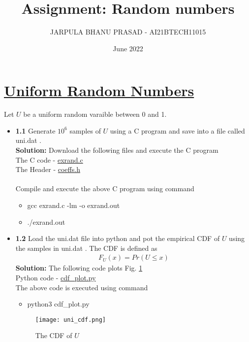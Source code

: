 \documentclass[journal,12pt,twocolumn]{IEEEtran}
\title{Assignment: Random numbers}
\author{JARPULA BHANU PRASAD - AI21BTECH11015}
\date{June 2022}
\begin{document}
\maketitle
\newcommand{\solution}{\noindent \textbf{Solution: }}

\section{\underline{Uniform Random Numbers}}
Let $U$ be a uniform random varaible between 0 and 1.
\begin{itemize}
    \item \textbf{1.1} Generate $10^6$ samples of $U$ using a C program and save into a file called uni.dat .\\
    \solution Download the following files and execute the C program \\
    The C code - \href{https://github.com/jarpula-Bhanu/Random-numbers/blob/main/codes/exrand.c}{exrand.c} \\
    The Header - \href{https://github.com/jarpula-Bhanu/Random-numbers/blob/main/codes/coeffs.h}{coeffs.h} \\ 
    \\Compile and execute the above C program using command
    \begin{itemize}
        \item gcc exrand.c -lm -o exrand.out
        \item ./exrand.out \\
    \end{itemize}
    
    \item \textbf{1.2} Load the uni.dat file into python and pot the empirical CDF of $U$ using the samples in uni.dat . The CDF is defined as 
    \begin{align}
        F_U(x) = Pr(U \le x)
    \end{align}
    \solution The following code plots Fig. \ref{fig:uni_cdf}
    \\
    Python code - \href{https://github.com/jarpula-Bhanu/Random-numbers/blob/main/codes/cdf_plot.py}{cdf\_plot.py} \\
    The above code is executed using command
    \begin{itemize}
        \item python3 cdf\_plot.py
    \end{itemize}
    \begin{figure}[h]
        \centering
        \texttt{[image: uni\_cdf.png]}
        \caption{The CDF of $U$}
        \label{fig:uni_cdf}
    \end{figure}


\end{itemize}
\end{document}
